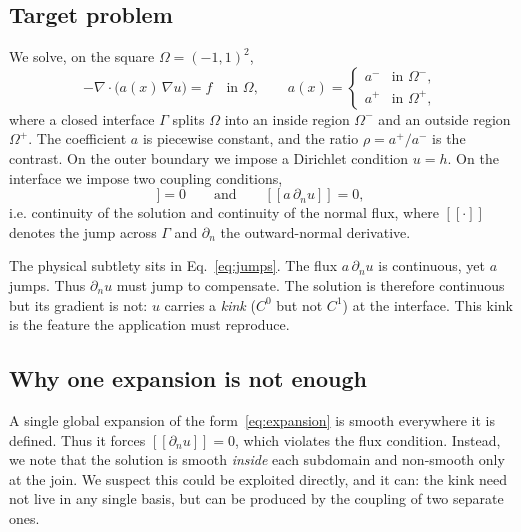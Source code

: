 \documentclass[preprint,12pt,authoryear]{elsarticle}
\begin{document}
\subsection{Target problem}
\label{subsec:target}
We solve, on the square $\Omega=(-1,1)^2$,
\begin{equation}
-\nabla\!\cdot\!\big(a(x)\,\nabla u\big) = f \quad\text{in }\Omega,
\qquad
a(x)=\begin{cases} a^- & \text{in } \Omega^-,\\[2pt] a^+ & \text{in } \Omega^+, \end{cases}
\label{eq:pde}
\end{equation}
where a closed interface $\Gamma$ splits $\Omega$ into an inside region $\Omega^-$ and an outside region $\Omega^+$. The coefficient $a$ is piecewise constant, and the ratio $\rho=a^+/a^-$ is the contrast. On the outer boundary we impose a Dirichlet condition $u=h$. On the interface we impose two coupling conditions,
\begin{equation}
[\![u]\!]=0
\qquad\text{and}\qquad
[\![a\,\partial_n u]\!]=0,
\label{eq:jumps}
\end{equation}
i.e. continuity of the solution and continuity of the normal flux, where $[\![\cdot]\!]$ denotes the jump across $\Gamma$ and $\partial_n$ the outward-normal derivative.

The physical subtlety sits in Eq.~\eqref{eq:jumps}. The flux $a\,\partial_n u$ is continuous, yet $a$ jumps. Thus $\partial_n u$ must jump to compensate. The solution is therefore continuous but its gradient is not: $u$ carries a \emph{kink} ($C^0$ but not $C^1$) at the interface. This kink is the feature the application must reproduce.

\subsection{Why one expansion is not enough}
\label{subsec:why-two}
A single global expansion of the form~\eqref{eq:expansion} is smooth everywhere it is defined. Thus it forces $[\![\partial_n u]\!]=0$, which violates the flux condition. Instead, we note that the solution is smooth \emph{inside} each subdomain and non-smooth only at the join. We suspect this could be exploited directly, and it can: the kink need not live in any single basis, but can be produced by the coupling of two separate ones.
\end{document}
